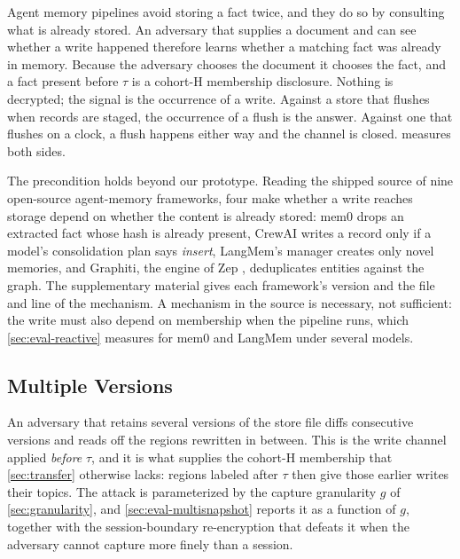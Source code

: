 Agent memory pipelines avoid storing a fact twice, and they do so by consulting what is already
stored. An adversary that supplies a document and can see whether a write happened therefore
learns whether a matching fact was already in memory. Because the adversary chooses the document
it chooses the fact, and a fact present before $\tau$ is a cohort-H membership disclosure.
Nothing is decrypted; the signal is the occurrence of a write. Against a store that flushes when
records are staged, the occurrence of a flush is the answer. Against one that flushes on a clock,
a flush happens either way and the channel is closed.  measures both sides.

The precondition holds beyond our prototype. Reading the shipped source of nine
open-source agent-memory frameworks, four make whether a write reaches storage depend on whether
the content is already stored: mem0 drops an extracted fact whose hash is already present, CrewAI
writes a record only if a model's consolidation plan says \emph{insert}, LangMem's manager creates
only novel memories, and Graphiti, the engine of Zep \cite{rasmussen2025zep}, deduplicates entities
against the graph. The supplementary material gives each framework's version and the file and line
of the mechanism. A mechanism in the source is necessary, not
sufficient: the write must also depend on membership when the pipeline runs, which
\cref{sec:eval-reactive} measures for mem0 and LangMem under several models.

\subsection{Multiple Versions}
\label{sec:attack-multisnapshot}

An adversary that retains several versions of the store file diffs consecutive versions and reads
off the regions rewritten in between. This is the write channel applied \emph{before} $\tau$, and
it is what supplies the cohort-H membership that \cref{sec:transfer} otherwise lacks: regions
labeled after $\tau$ then give those earlier writes their topics. The attack is parameterized by
the capture granularity $g$ of \cref{sec:granularity}, and \cref{sec:eval-multisnapshot} reports it
as a function of $g$, together with the session-boundary re-encryption that defeats it when the
adversary cannot capture more finely than a session.

